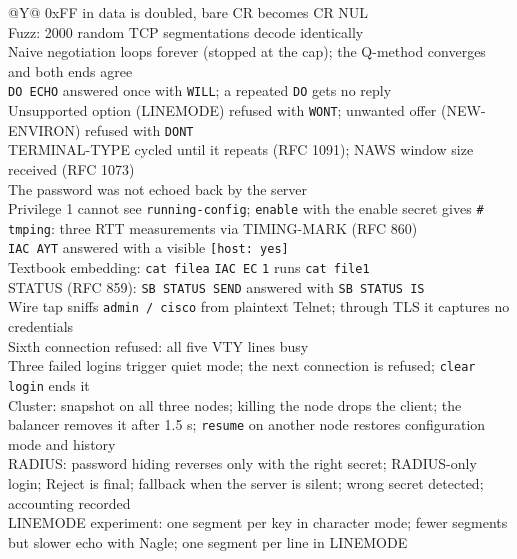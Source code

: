 \documentclass[11pt,a4paper]{article}
\begin{document}
\begin{table}[H]
\centering
\caption{Selected verification checks (all passed)}
\small
\begin{tabularx}{\textwidth}{@{}Y@{}}
\toprule
0xFF in data is doubled, bare CR becomes CR NUL \\
Fuzz: 2000 random TCP segmentations decode identically \\
Naive negotiation loops forever (stopped at the cap); the Q-method converges and both ends agree \\
\texttt{DO ECHO} answered once with \texttt{WILL}; a repeated \texttt{DO} gets no reply \\
Unsupported option (LINEMODE) refused with \texttt{WONT}; unwanted offer (NEW-ENVIRON) refused with \texttt{DONT} \\
TERMINAL-TYPE cycled until it repeats (RFC 1091); NAWS window size received (RFC 1073) \\
The password was not echoed back by the server \\
Privilege 1 cannot see \texttt{running-config}; \texttt{enable} with the enable secret gives \texttt{\#} \\
\texttt{tmping}: three RTT measurements via TIMING-MARK (RFC 860) \\
\texttt{IAC AYT} answered with a visible \texttt{[host: yes]} \\
Textbook embedding: \texttt{cat filea} \texttt{IAC EC} \texttt{1} runs \texttt{cat file1} \\
STATUS (RFC 859): \texttt{SB STATUS SEND} answered with \texttt{SB STATUS IS} \\
Wire tap sniffs \texttt{admin / cisco} from plaintext Telnet; through TLS it captures no credentials \\
Sixth connection refused: all five VTY lines busy \\
Three failed logins trigger quiet mode; the next connection is refused; \texttt{clear login} ends it \\
Cluster: snapshot on all three nodes; killing the node drops the client; the balancer removes it after 1.5 s; \texttt{resume} on another node restores configuration mode and history \\
RADIUS: password hiding reverses only with the right secret; RADIUS-only login; Reject is final; fallback when the server is silent; wrong secret detected; accounting recorded \\
LINEMODE experiment: one segment per key in character mode; fewer segments but slower echo with Nagle; one segment per line in LINEMODE \\ \bottomrule
\end{tabularx}
\end{table}
\end{document}

